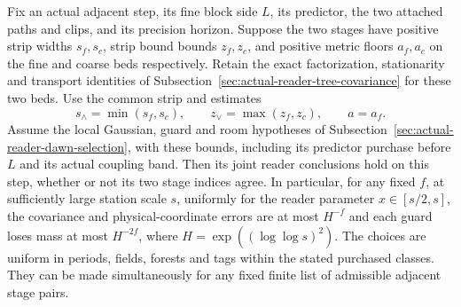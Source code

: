 \begin{lemma}
\label{lem:allarity-pair-reader}
Fix an actual adjacent step, its fine block side $L$, its predictor,
the two attached paths and clips, and its precision horizon. Suppose
the two stages have positive strip widths $s_f,s_c$, strip bound
bounds $z_f,z_c$, and positive metric floors $a_f,a_c$ on the fine
and coarse beds respectively. Retain the exact
factorization, stationarity and transport identities of
Subsection~\ref{sec:actual-reader-tree-covariance} for these two beds.
Use the common strip and estimates
\[
 s_\wedge=\min(s_f,s_c),\qquad z_\vee=\max(z_f,z_c),
 \qquad a=a_f.
\]
Assume the local Gaussian, guard and room hypotheses of
Subsection~\ref{sec:actual-reader-dawn-selection}, with these bounds,
including its predictor purchase before $L$ and its actual coupling
band. Then its joint reader conclusions hold on this step, whether
or not its two stage indices agree. In particular, for any fixed $f$,
at sufficiently large station scale $s$, uniformly for the reader
parameter $x\in[s/2,s]$, the covariance and physical-coordinate
errors are at most $H^{-f}$ and each guard loses mass at most
$H^{-2f}$, where $H=\exp((\log\log s)^2)$.
The choices are uniform in periods, fields, forests and tags within
the stated purchased classes. They can be made simultaneously for
any fixed finite list of admissible adjacent stage pairs.
\end{lemma}
